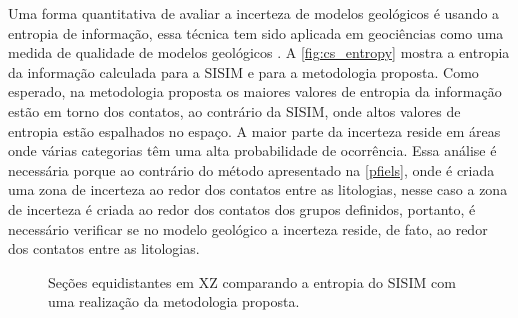 Uma forma quantitativa de avaliar a incerteza de modelos geológicos é usando a entropia de informação, essa técnica tem sido aplicada em geociências como uma medida de qualidade de modelos geológicos \cite{yang2019assessing}. A \autoref{fig:cs_entropy} mostra a entropia da informação calculada para a SISIM e para a metodologia proposta. Como esperado, na metodologia proposta os maiores valores de entropia da informação estão em torno dos contatos, ao contrário da SISIM, onde altos valores de entropia estão espalhados no espaço. A maior parte da incerteza reside em áreas onde várias categorias têm uma alta probabilidade de ocorrência. Essa análise é necessária porque ao contrário do método apresentado na \autoref{pfiels}, onde é criada uma zona de incerteza ao redor dos contatos entre as litologias, nesse caso a zona de incerteza é criada ao redor dos contatos dos grupos definidos, portanto, é necessário verificar se no modelo geológico a incerteza reside, de fato, ao redor dos contatos entre as litologias.

\begin{figure}[H]
    \caption{Seções equidistantes em XZ comparando a entropia do SISIM com uma realização da metodologia proposta.} \label{fig:cs_entropy}
     \centering
     \hspace{1em}
\end{figure}

